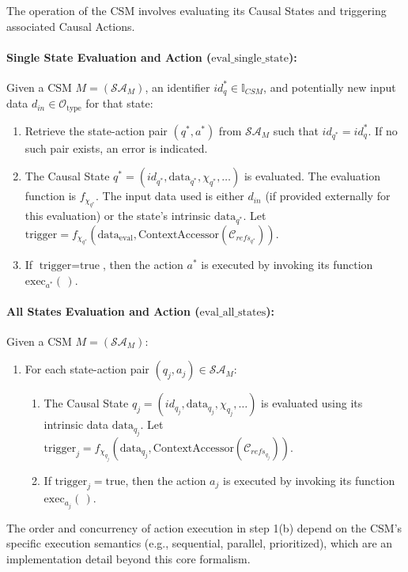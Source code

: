     The operation of the CSM involves evaluating its Causal States and triggering associated Causal Actions.

    \paragraph{Single State Evaluation and Action (\(\text{eval\_single\_state}\)):}
    Given a CSM \(M = (\mathcal{SA}_M)\), an identifier \(id_q^* \in \mathbb{I}_{CSM}\), and potentially new input data \(d_{in} \in \mathcal{O}_{\text{type}}\) for that state:
    \begin{enumerate}
        \item Retrieve the state-action pair \((q^*, a^*)\) from \(\mathcal{SA}_M\) such that \(id_{q^*} = id_q^*\). If no such pair exists, an error is indicated.
        \item The Causal State \(q^* = (id_{q^*}, \text{data}_{q^*}, \chi_{q^*}, \dots)\) is evaluated. The evaluation function is \(f_{\chi_{q^*}}\). The input data used is either \(d_{in}\) (if provided externally for this evaluation) or the state's intrinsic \(\text{data}_{q^*}\).
        Let \( \text{trigger} = f_{\chi_{q^*}}(\text{data}_{\text{eval}}, \text{ContextAccessor}(\mathcal{C}_{refs_{q^*}})) \).
        \item If \(\text{trigger} = \text{true}\), then the action \(a^*\) is executed by invoking its function \(\text{exec}_{a^*}(\,)\).
    \end{enumerate}


    \paragraph{All States Evaluation and Action (\(\text{eval\_all\_states}\)):}
    Given a CSM \(M = (\mathcal{SA}_M)\):
    \begin{enumerate}
        \item For each state-action pair \((q_j, a_j) \in \mathcal{SA}_M\):
            \begin{enumerate}
                \item The Causal State \(q_j = (id_{q_j}, \text{data}_{q_j}, \chi_{q_j}, \dots)\) is evaluated using its intrinsic data \(\text{data}_{q_j}\).
                Let \( \text{trigger}_j = f_{\chi_{q_j}}(\text{data}_{q_j}, \text{ContextAccessor}(\mathcal{C}_{refs_{q_j}})) \).
                \item If \(\text{trigger}_j = \text{true}\), then the action \(a_j\) is executed by invoking its function \(\text{exec}_{a_j}(\,)\).
            \end{enumerate}
    \end{enumerate}
    The order and concurrency of action execution in step 1(b) depend on the CSM's specific execution semantics (e.g., sequential, parallel, prioritized), which are an implementation detail beyond this core formalism. 

